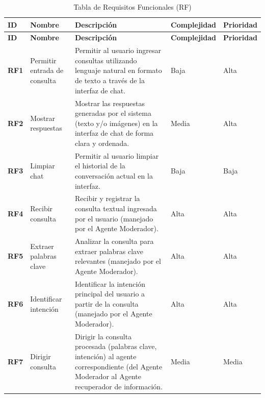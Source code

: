\begin{longtable}{@{}l >{\raggedright\arraybackslash}p{4cm} >{\raggedright\arraybackslash}p{7cm} l l@{}} %
	\caption{Tabla de Requisitos Funcionales (RF)} \label{tab:requisitos_funcionales_con_prioridad} \\ 
	\toprule
	\textbf{ID} & \textbf{Nombre} & \textbf{Descripción} & \textbf{Complejidad} & \textbf{Prioridad} \\ %
	\midrule
	\endfirsthead %
	\toprule
	\textbf{ID} & \textbf{Nombre} & \textbf{Descripción} & \textbf{Complejidad} & \textbf{Prioridad} \\ %
	\midrule
	\endhead %
	
	\endfoot %
	
	\bottomrule
	\endlastfoot %
	
	\textbf{RF1} & Permitir entrada de consulta & Permitir al usuario ingresar consultas utilizando lenguaje natural en formato de texto a través de la interfaz de chat. & Baja & Alta \\ %
	\textbf{RF2} & Mostrar respuestas & Mostrar las respuestas generadas por el sistema (texto y/o imágenes) en la interfaz de chat de forma clara y ordenada. & Media & Alta \\ %
	\textbf{RF3} & Limpiar chat & Permitir al usuario limpiar el historial de la conversación actual en la interfaz. & Baja & Baja \\ %
	\midrule
	
	\textbf{RF4} & Recibir consulta & Recibir y registrar la consulta textual ingresada por el usuario (manejado por el Agente Moderador). & Alta & Alta \\ %
	\textbf{RF5} & Extraer palabras clave & Analizar la consulta para extraer palabras clave relevantes (manejado por el Agente Moderador). & Alta & Alta \\ %
	\textbf{RF6} & Identificar intención & Identificar la intención principal del usuario a partir de la consulta (manejado por el Agente Moderador). & Alta & Alta \\ %
	\textbf{RF7} & Dirigir consulta & Dirigir la consulta procesada (palabras clave, intención) al agente correspondiente (del Agente Moderador al Agente recuperador de información. & Media & Media \\ %
	\midrule
	

\end{longtable}
